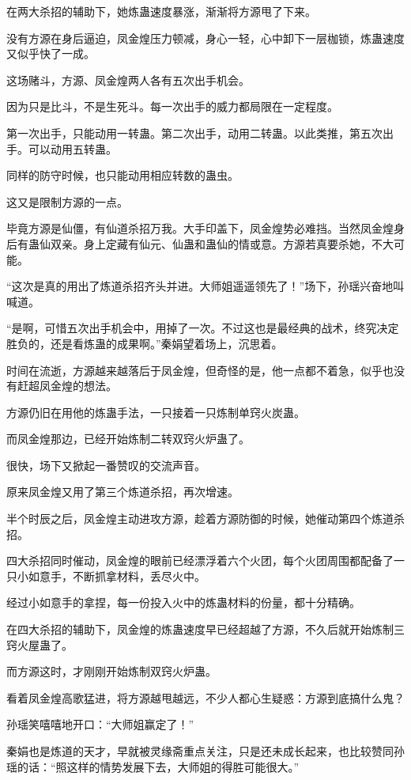 \begin{this_body}
在两大杀招的辅助下，她炼蛊速度暴涨，渐渐将方源甩了下来。

没有方源在身后逼迫，凤金煌压力顿减，身心一轻，心中卸下一层枷锁，炼蛊速度又似乎快了一成。

这场赌斗，方源、凤金煌两人各有五次出手机会。

因为只是比斗，不是生死斗。每一次出手的威力都局限在一定程度。

第一次出手，只能动用一转蛊。第二次出手，动用二转蛊。以此类推，第五次出手。可以动用五转蛊。

同样的防守时候，也只能动用相应转数的蛊虫。

这又是限制方源的一点。

毕竟方源是仙僵，有仙道杀招万我。大手印盖下，凤金煌势必难挡。当然凤金煌身后有蛊仙双亲。身上定藏有仙元、仙蛊和蛊仙的情或意。方源若真要杀她，不大可能。

“这次是真的用出了炼道杀招齐头并进。大师姐遥遥领先了！”场下，孙瑶兴奋地叫喊道。

“是啊，可惜五次出手机会中，用掉了一次。不过这也是最经典的战术，终究决定胜负的，还是看炼蛊的成果啊。”秦娟望着场上，沉思着。

时间在流逝，方源越来越落后于凤金煌，但奇怪的是，他一点都不着急，似乎也没有赶超凤金煌的想法。

方源仍旧在用他的炼蛊手法，一只接着一只炼制单窍火炭蛊。

而凤金煌那边，已经开始炼制二转双窍火炉蛊了。

很快，场下又掀起一番赞叹的交流声音。

原来凤金煌又用了第三个炼道杀招，再次增速。

半个时辰之后，凤金煌主动进攻方源，趁着方源防御的时候，她催动第四个炼道杀招。

四大杀招同时催动，凤金煌的眼前已经漂浮着六个火团，每个火团周围都配备了一只小如意手，不断抓拿材料，丢尽火中。

经过小如意手的拿捏，每一份投入火中的炼蛊材料的份量，都十分精确。

在四大杀招的辅助下，凤金煌的炼蛊速度早已经超越了方源，不久后就开始炼制三窍火屋蛊了。

而方源这时，才刚刚开始炼制双窍火炉蛊。

看着凤金煌高歌猛进，将方源越甩越远，不少人都心生疑惑：方源到底搞什么鬼？

孙瑶笑嘻嘻地开口：“大师姐赢定了！”

秦娟也是炼道的天才，早就被灵缘斋重点关注，只是还未成长起来，也比较赞同孙瑶的话：“照这样的情势发展下去，大师姐的得胜可能很大。”


\end{this_body}

